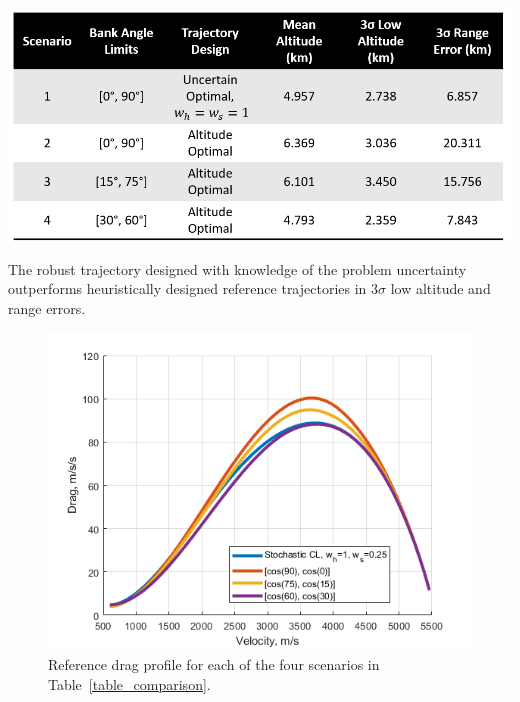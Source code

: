 \documentclass[journal ]{new-aiaa}
\begin{document}
\begin{table}[h!]
	\centering
	\includegraphics[width=1\textwidth]{ddp/comparison_table}
	\caption{The robust trajectory designed with knowledge of the problem uncertainty outperforms heuristically designed reference trajectories in $3\sigma$ low altitude and range errors.}
	\label{table_comparison}
\end{table}
\begin{figure}[h!]
	\centering
	\includegraphics[width=1\textwidth]{ddp/matlab/ComparisonDrag}
	\caption{Reference drag profile for each of the four scenarios in Table~\ref{table_comparison}.}
	\label{fig_drag}
\end{figure}
\end{document}
